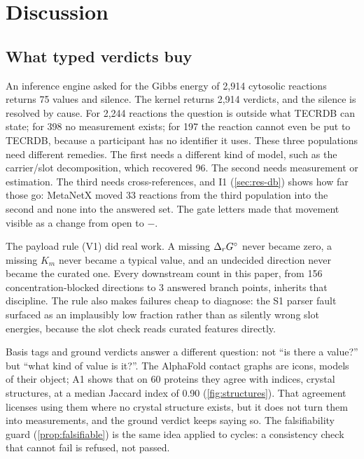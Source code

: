 \section{Discussion}
\label{sec:discussion}

\subsection{What typed verdicts buy}
\label{sec:disc-verdicts}

An inference engine asked for the Gibbs energy of 2{,}914 cytosolic reactions returns 75 values and silence.
The kernel returns 2{,}914 verdicts, and the silence is resolved by cause.
For 2{,}244 reactions the question is outside what TECRDB can state; for 398 no measurement exists; for 197 the reaction cannot even be put to TECRDB, because a participant has no identifier it uses.
These three populations need different remedies.
The first needs a different kind of model, such as the carrier/slot decomposition, which recovered 96.
The second needs measurement or estimation.
The third needs cross-references, and I1 (\cref{sec:res-db}) shows how far those go: MetaNetX moved 33 reactions from the third population into the second and none into the answered set.
The gate letters made that movement visible as a change from \textsf{open} to $-$.

The payload rule (V1) did real work.
A missing $\Delta_r G^\circ$ never became zero, a missing $K_m$ never became a typical value, and an undecided direction never became the curated one.
Every downstream count in this paper, from 156 concentration-blocked directions to 3 answered branch points, inherits that discipline.
The rule also makes failures cheap to diagnose: the S1 parser fault surfaced as an implausibly low fraction rather than as silently wrong slot energies, because the slot check reads curated features directly.

Basis tags and ground verdicts answer a different question: not ``is there a value?'' but ``what kind of value is it?''.
The AlphaFold contact graphs are icons, models of their object; A1 shows that on 60 proteins they agree with indices, crystal structures, at a median Jaccard index of 0.90 (\cref{fig:structures}).
That agreement licenses using them where no crystal structure exists, but it does not turn them into measurements, and the ground verdict keeps saying so.
The falsifiability guard (\cref{prop:falsifiable}) is the same idea applied to cycles: a consistency check that cannot fail is refused, not passed.

